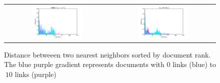 \begin{figure}[h!]
\begin{tabular}{cc}
\includegraphics[width =0.5\textwidth]{images/thresh_cosine_simple_tag_similarity_distances} 	& \includegraphics[width =0.5\textwidth]{images/thresh_cosine_tag_smoothing_distances}
\end{tabular}
\caption{Distance betweeen two nearest neighbors sorted by document rank. The blue purple gradient represents documents with 0 links (blue) to $\>10$ links (purple)}
\label{fig:thresholds_differences}
\end{figure}
